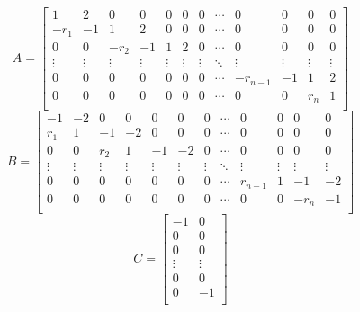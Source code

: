 \begin{mdframed}[style=zkprotocolwithheader, frametitle=Adding ZK to sumcheck]
\begin{enumerate}
        \[
        A = 
        \left[
        \begin{array}{*{12}{c}}
            1      & 2      & 0      & 0      & 0      & 0      & 0      & \cdots & 0      & 0      & 0      & 0      \\
            -r_1   & -1     & 1      & 2      & 0      & 0      & 0      & \cdots & 0      & 0      & 0      & 0      \\
            0      & 0      & -r_2   & -1     & 1      & 2      & 0      & \cdots & 0      & 0      & 0      & 0      \\
            \vdots & \vdots & \vdots & \vdots & \vdots & \vdots & \vdots & \ddots & \vdots & \vdots & \vdots & \vdots \\
            0      & 0      & 0      & 0      & 0      & 0      & 0      & \cdots & -r_{n-1}& -1    & 1      & 2      \\
            0      & 0      & 0      & 0      & 0      & 0      & 0      & \cdots & 0      & 0      & r_n    & 1      \\
        \end{array}
        \right]
        \]
        \[
        B = 
        \left[
        \begin{array}{*{12}{c}}
            -1     & -2     & 0      & 0      & 0      & 0      & 0      & \cdots & 0      & 0      & 0      & 0      \\
            r_1    & 1      & -1     & -2     & 0      & 0      & 0      & \cdots & 0      & 0      & 0      & 0      \\
            0      & 0      & r_2    & 1      & -1     & -2     & 0      & \cdots & 0      & 0      & 0      & 0      \\
            \vdots & \vdots & \vdots & \vdots & \vdots & \vdots & \vdots & \ddots & \vdots & \vdots & \vdots & \vdots \\
            0      & 0      & 0      & 0      & 0      & 0      & 0      & \cdots & r_{n-1}& 1      & -1     & -2     \\
            0      & 0      & 0      & 0      & 0      & 0      & 0      & \cdots & 0      & 0      & -r_n   & -1     \\
        \end{array}
        \right]
        \]
        \begin{equation*}
            C = 
            \begin{bmatrix}
                -1 & 0 \\
                0 & 0 \\
                0 & 0\\
                \vdots & \vdots \\
                0 & 0\\
                0 & -1\\
            \end{bmatrix}
        \end{equation*}


\end{enumerate}
\end{mdframed}
